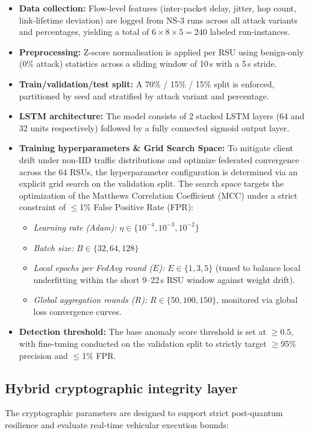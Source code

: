 \documentclass[12pt, a4paper]{report}
\begin{document}
{{\begin{itemize}
    \item \textbf{Data collection:} Flow-level features (inter-packet delay, jitter, hop count, link-lifetime deviation) are logged from NS-3 runs across all attack variants and percentages, yielding a total of $6 \times 8 \times 5 = 240$ labeled run-instances.
    \item \textbf{Preprocessing:} Z-score normalisation is applied per RSU using benign-only (0\% attack) statistics across a sliding window of 10\,s with a 5\,s stride.
    \item \textbf{Train/validation/test split:} A 70\% / 15\% / 15\% split is enforced, partitioned by seed and stratified by attack variant and percentage.
    \item \textbf{LSTM architecture:} The model consists of 2 stacked LSTM layers (64 and 32 units respectively) followed by a fully connected sigmoid output layer.
    \item \textbf{Training hyperparameters \& Grid Search Space:} To mitigate client drift under non-IID traffic distributions and optimize federated convergence across the 64 RSUs, the hyperparameter configuration is determined via an explicit grid search on the validation split. The search space targets the optimization of the Matthews Correlation Coefficient (MCC) under a strict constraint of $\le$1\% False Positive Rate (FPR):
    \begin{itemize}
        \item \textit{Learning rate (Adam):} $\eta \in \{10^{-4}, 10^{-3}, 10^{-2}\}$
        \item \textit{Batch size:} $B \in \{32, 64, 128\}$
        \item \textit{Local epochs per FedAvg round ($E$):} $E \in \{1, 3, 5\}$ (tuned to balance local underfitting within the short 9--22\,s RSU window against weight drift).
        \item \textit{Global aggregation rounds ($R$):} $R \in \{50, 100, 150\}$, monitored via global loss convergence curves.
    \end{itemize}
    \item \textbf{Detection threshold:} The base anomaly score threshold is set at $\geq 0.5$, with fine-tuning conducted on the validation split to strictly target $\geq$95\% precision and $\le$1\% FPR.
\end{itemize}

\subsection{Hybrid cryptographic integrity layer}
The cryptographic parameters are designed to support strict post-quantum resilience and evaluate real-time vehicular execution bounds:

}}
\end{document}
